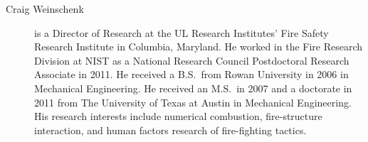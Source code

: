 \begin{description}


\item[Craig Weinschenk] is a Director of Research at the UL Research Institutes' Fire Safety Research Institute in Columbia, Maryland. He worked in the Fire Research Division at NIST as a National Research Council Postdoctoral Research Associate in 2011. He received a B.S.~from Rowan University in 2006 in Mechanical Engineering. He received an M.S.~in 2007 and a doctorate in 2011 from The University of Texas at Austin in Mechanical Engineering. His research interests include numerical combustion, fire-structure interaction, and human factors research of fire-fighting tactics.

\end{description}



